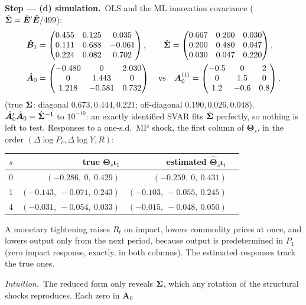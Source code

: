 \documentclass[11pt,a4paper]{article}
\newcommand{\passo}[2]{\par\smallskip\noindent\textbf{Step --- #1.}~#2}
\newcommand{\intuicao}[1]{\par\smallskip\noindent\textit{Intuition.}~#1}
\begin{document}
\begin{sol}
\passo{(d) simulation}{OLS and the ML innovation covariance ($\hat{\bm{\Sigma}}=\hat{\bm E}'\hat{\bm E}/499$):
\begin{align}
\hat{\bm B}_1&=\begin{pmatrix}0.455&0.125&0.035\\0.111&0.688&-0.061\\0.224&0.082&0.702\end{pmatrix},\qquad
\hat{\bm{\Sigma}}=\begin{pmatrix}0.667&0.200&0.030\\0.200&0.480&0.047\\0.030&0.047&0.220\end{pmatrix},\nonumber\\
\hat{\bm A}_0&=\begin{pmatrix}-0.480&0&2.030\\0&1.443&0\\1.218&-0.581&0.732\end{pmatrix}
\quad\text{vs}\quad
\bm A_0^{(1)}=\begin{pmatrix}-0.5&0&2\\0&1.5&0\\1.2&-0.6&0.8\end{pmatrix},\nonumber
\end{align}
(true $\bm{\Sigma}$: diagonal $0.673,0.444,0.221$; off-diagonal $0.190,0.026,0.048$). $\hat{\bm A}_0'\hat{\bm A}_0=\hat{\bm{\Sigma}}^{-1}$ to
$10^{-10}$: an exactly identified SVAR fits $\hat{\bm{\Sigma}}$ perfectly, so nothing is left to test. Responses to a one-s.d.\ MP shock,
the first column of $\bm\Theta_s$, in the order $(\Delta\log P_c,\Delta\log Y,R)$:}
\begin{center}\small
\begin{tabular}{lrrr}
\toprule
$s$ & true $\bm\Theta_s\bm\iota_1$ & estimated $\hat{\bm\Theta}_s\bm\iota_1$\\
\midrule
0 & $(-0.286,\ 0,\ 0.429)$ & $(-0.259,\ 0,\ 0.431)$\\
1 & $(-0.143,\ -0.071,\ 0.243)$ & $(-0.103,\ -0.055,\ 0.245)$\\
4 & $(-0.031,\ -0.054,\ 0.033)$ & $(-0.015,\ -0.048,\ 0.050)$\\
\bottomrule
\end{tabular}
\end{center}
A monetary tightening raises $R_t$ on impact, lowers commodity prices at once, and lowers output only from the next period, because
output is predetermined in $P_1$ (zero impact response, exactly, in both columns). The estimated responses track the true ones.
\intuicao{The reduced form only reveals $\bm{\Sigma}$, which any rotation of the structural shocks reproduces. Each zero in $\bm A_0$
}
\end{sol}
\end{document}
